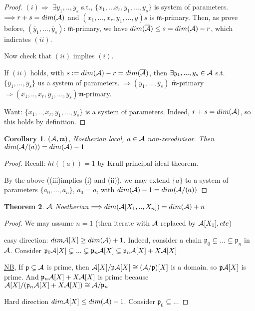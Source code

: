 \documentclass[11pt]{article}
\newtheorem{thm}{Theorem}[section]
\newtheorem{cor}[thm]{Corollary}
\newcommand{\scm}{{\mathfrak m}}
\newcommand{\scp}{{\mathfrak p}}
\newcommand{\cala}{{\cal A}}
\newcommand{\Lrta}{\Longrightarrow}
\begin{document}
\begin{proof}
$(i)\Lrta$ $\exists y_1,..,y_s$ s.t., $\{x_1,...x_r,y_1,...,y_s\}$ is system of parameters.
$\Lrta r+s=dim(\cala)$ and $(x_1,...,x_r,y_1,...,y)s$ is $\scm$-primary. Then, as prove before, $(\overline{y}_1,...,\overline{y}_s)$: $\overline{\scm}$-primary, we have $dim(\overline{\cala})\leq s=dim(\cala)-r$, which indicates $(ii)$.

Now check that $(ii)$ implies $(i)$.

If $(ii)$ holds, with $s:=dim(\cala)-r=dim(\overline{\cala})$, then $\exists y_1,...,y_s\in\cala$ s.t. $\{\overline{y}_1,...,\overline{y}_s\}$ us a system of parameters. $\Lrta(\overline{y}_1,...,\overline{y}_s)$ $\overline{\scm}$-primary $\Lrta (x_1,..,x_r,y_1,...,y_s)\scm$-primary.

Want: $\{x_1,..,x_r,y_1,...,y_s\}$ is a system of parameters. Indeed, $r+s=dim(\cala)$, so this holds by definition. 
\end{proof}

\begin{cor}
$(\cala,\scm)$, Noetherian local, $a\in\cala$ non-zerodivisor. Then $dim(\cala/(a))=dim(\cala)-1$
\end{cor}
\begin{proof}
Recall: $ht((a))=1$ by Krull principal ideal theorem.

By the above ((iii)implies (i) and (ii)), we may extend $\{a\}$ to a system of parameters $\{a_0,...,a_n\}$, $a_0=a$, with $dim(\cala)-1=dim(\cala/(a))$
\end{proof}

\begin{thm}
$\cala$ Noetherian $\Lrta dim(\cala[X_1,..,X_n])=dim(\cala)+n$
\end{thm}
\begin{proof}
We may assume $n=1$ (then iterate with $\cala$ replaced by $\cala[X_1], etc$)

easy direction: $dim \cala[X]\geq dim(\cala)+1$. Indeed, consider a chain $\scp_0\subsetneq ...\subsetneq \scp_n$ in $\cala$. Consider $\scp_0\cala[X]\subsetneq ...\subsetneq \scp_n\cala[X]\subsetneq \scp_n\cala[X]+X\cala[X]$

\underline{NB}, If $\scp\subsetneq \cala$ is prime, then $\cala[X]/\scp\cala[X]\cong (\cala/\scp)[X]$ is  a domain. so $\scp\cala[X]$ is prime.
And $\scp_n\cala[X]+X\cala[X]$ is prime because $\cala[X]/(\scp_n\cala[X]+X\cala[X])\cong \cala/\scp_n$

Hard direction $dim\cala[X]\leq dim(\cala)-1$. Consider $\scp_0\subseteq...$
\end{proof}
\end{document}
